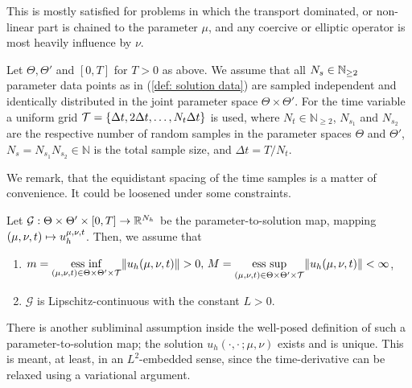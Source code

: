 This is mostly satisfied for problems in which the transport dominated, or non-linear part is chained
to the parameter $\mu$, and
any coercive or elliptic operator is most heavily influence by $\nu$.

\begin{assumption} \label{assumption sample}    
    Let $\Theta, \Theta'$ and $[0, T]$
    for $T > 0$ as above. We assume that all $N_s \in \mathbb{N}_{\geq 2}$ parameter data points as in 
    (\ref{def: solution data}) are sampled 
    independent and identically distributed in the joint parameter space $\Theta \times \Theta'$.
    For the time variable a uniform grid 
    $\mathcal{T} = \{\Delta t, 2 \Delta t, \dots, N_t \Delta t \}$ is used, 
    where $N_t \in \mathbb{N}_{\geq 2}$, $N_{s_1}$ and $N_{s_2}$ 
    are the respective number of random samples in the parameter spaces $\Theta$ and $\Theta'$,
    $N_s = N_{s_1} N_{s_2} \in \mathbb{N}$ is the total sample size, and $\Delta t = T / N_t$.
\end{assumption}

We remark, that the equidistant spacing of the time samples is a matter of convenience. 
It could be loosened under some constraints.

\begin{assumption} \label{assumption parameter-to-solution map}
    Let $\mathcal{G}: \Theta \times \Theta' \times [0, T] \to \mathbb{R}^{N_h}$ be the parameter-to-solution map, 
    mapping $(\mu, \nu, t) \mapsto u_h^{\mu, \nu, t}$. Then, we assume that
    \begin{enumerate}
        \item $m = 
        \underset{(\mu, \nu, t) \in \Theta \times \Theta' \times \mathcal{T}}{\operatorname{ess}\, \inf}
        \lVert u_h(\mu, \nu, t) \rVert > 0, \, M = 
        \underset{(\mu, \nu, t) \in \Theta \times \Theta' \times \mathcal{T}}{\operatorname{ess}\, \sup}
        \lVert u_h(\mu, \nu, t) \rVert < \infty$,
        \item $\mathcal{G}$ is Lipschitz-continuous with the constant $L > 0$.
    \end{enumerate}
\end{assumption}

There is another subliminal assumption inside the well-posed definition of such a parameter-to-solution map; the solution 
$u_h(\cdot, \cdot \, ; \mu, \nu)$ exists and is unique. This is meant, at least, in an $L^2$-embedded sense, 
since the time-derivative can be relaxed using a variational argument. 

